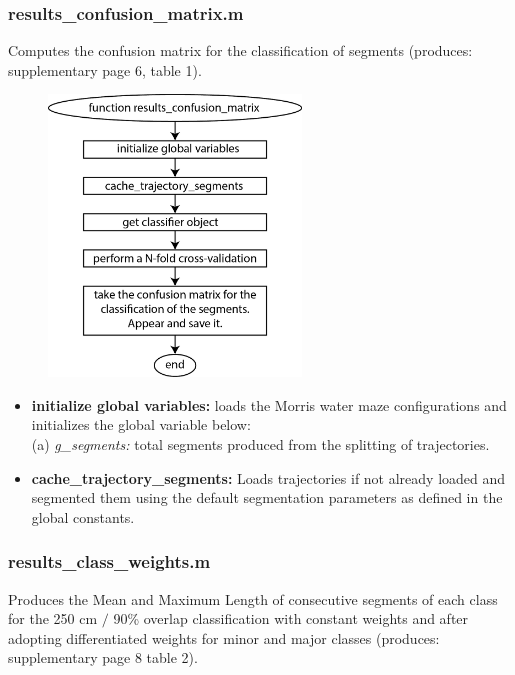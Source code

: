 \documentclass[12pt,titlepage]{article}
\begin{document}
\begin{doublespace}
\subsubsection{results\_confusion\_matrix.m}
Computes the confusion matrix for the classification of segments (produces: supplementary page 6, table 1).

\begin{figure}[H]
	\begin{center}
		\includegraphics[width=0.6\textwidth]{results_confusion_matrix.jpg}
		\label{stable1}
	\end{center}
\end{figure}

\begin{itemize}
	\item\textbf{initialize global variables:} loads the Morris water maze configurations and initializes the global variable below:\\
	(a) \textit{g\_segments:} total segments produced from the splitting of trajectories.
	\item\textbf{cache\_trajectory\_segments:} Loads trajectories if not already loaded and segmented them using the default segmentation parameters as defined in the global constants.
\end{itemize}

\subsubsection{results\_class\_weights.m}
Produces the Mean and Maximum Length of consecutive segments of each class for the 250 cm $/$ 90\% overlap classification with constant weights and after adopting differentiated weights for minor and major classes (produces: supplementary page 8 table 2).


\end{doublespace}
\end{document}
